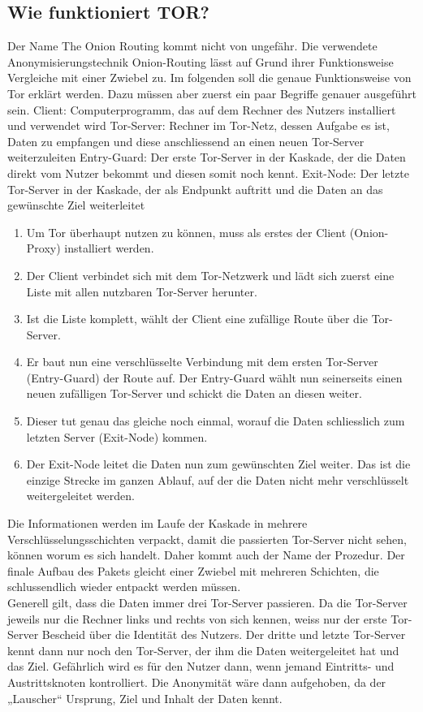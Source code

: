 \subsection{Wie funktioniert TOR?}
Der Name The Onion Routing kommt nicht von ungefähr. Die verwendete Anonymisierungstechnik Onion-Routing lässt auf Grund ihrer Funktionsweise Vergleiche mit einer Zwiebel zu. Im folgenden soll die genaue Funktionsweise von Tor erklärt werden. Dazu müssen aber zuerst ein paar Begriffe genauer ausgeführt sein.
Client: Computerprogramm, das auf dem Rechner des Nutzers installiert und verwendet wird
Tor-Server: Rechner im Tor-Netz, dessen Aufgabe es ist, Daten zu empfangen und diese anschliessend an einen neuen Tor-Server weiterzuleiten
Entry-Guard: Der erste Tor-Server in der Kaskade, der die Daten direkt vom Nutzer bekommt und diesen somit noch kennt.
Exit-Node: Der letzte Tor-Server in der Kaskade, der als Endpunkt auftritt und die Daten an das gewünschte Ziel weiterleitet
\begin{enumerate}
\item Um Tor überhaupt nutzen zu können, muss als erstes der  Client (Onion-Proxy) installiert werden.
\item Der Client verbindet sich mit dem Tor-Netzwerk und lädt sich zuerst eine Liste mit allen nutzbaren Tor-Server herunter.
\item Ist die Liste komplett, wählt der Client eine zufällige Route über die Tor-Server.
\item Er baut nun eine verschlüsselte Verbindung mit dem ersten Tor-Server (Entry-Guard) der Route auf. Der Entry-Guard wählt nun seinerseits einen neuen zufälligen Tor-Server und schickt die Daten an diesen weiter.
\item Dieser tut genau das gleiche noch einmal, worauf die Daten schliesslich zum letzten Server (Exit-Node) kommen.
\item Der Exit-Node leitet die Daten nun zum gewünschten Ziel weiter. Das ist die einzige Strecke im ganzen Ablauf, auf der die Daten nicht mehr verschlüsselt weitergeleitet werden.
\end{enumerate}
Die Informationen werden im Laufe der Kaskade in mehrere Verschlüsselungsschichten verpackt, damit die passierten Tor-Server nicht sehen, können worum es sich handelt. Daher kommt auch der Name der Prozedur. Der finale Aufbau des Pakets gleicht einer Zwiebel mit mehreren Schichten, die  schlussendlich wieder entpackt werden müssen.
\\
Generell gilt, dass die Daten immer drei Tor-Server passieren. Da die Tor-Server jeweils nur die Rechner links und rechts von sich kennen, weiss nur der erste Tor-Server Bescheid über die Identität des Nutzers. Der dritte und letzte Tor-Server kennt dann nur noch den Tor-Server, der ihm die Daten weitergeleitet hat und das Ziel. Gefährlich wird es für den Nutzer dann, wenn jemand Eintritts- und Austrittsknoten kontrolliert. Die Anonymität wäre dann aufgehoben, da der „Lauscher“ Ursprung, Ziel und Inhalt der Daten kennt.
